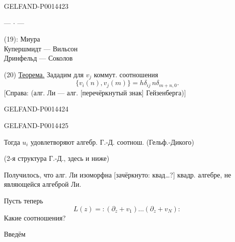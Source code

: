 \begin{GelfandAdjacentEvidence}{GELFAND-P001442}{3}


\begin{center}— \(\cdot\) —\end{center}

 (19): Миура\\
\hspace*{3em}Купершмидт — Вильсон\\
\hspace*{3em}Дринфельд — Соколов

(20) \uline{Теорема.} Зададим для \(v_j\) коммут. соотношения
\begin{equation*}
\{v_i(n),v_j(m)\}=h\delta_{ij}\,n\delta_{m+n,0} . \tag{21}
\end{equation*}
[Справа: (алг. Ли — алг. [перечёркнутый знак] Гейзенберга)]
\end{GelfandAdjacentEvidence}
\begin{GelfandAdjacentEvidence}{GELFAND-P001442}{4}

\end{GelfandAdjacentEvidence}
\begin{GelfandAdjacentEvidence}{GELFAND-P001442}{5}


Тогда \(u_i\) удовлетворяют алгебр. Г.-Д. соотнош. (Гельф.-Дикого)

(2-я структура Г.-Д., здесь и ниже)

Получилось, что алг. Ли изоморфна [зачёркнуто: квад…?] квадр. алгебре, не являющейся алгеброй Ли.
\end{GelfandAdjacentEvidence}


Пусть теперь
\begin{equation*}
L(z)={:}(\partial_z+v_1)\ldots(\partial_z+v_N){:} \tag{22}
\end{equation*}
Какие соотношения?

Введём


